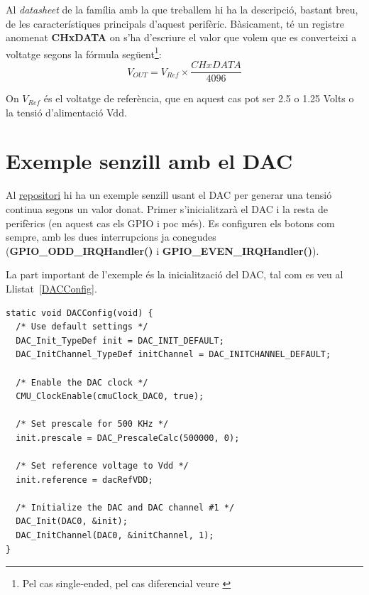 Al {\em datasheet} de la família amb la que treballem \cite[421]{EFM32GRM} hi ha la descripció, bastant breu, de les característiques principals d'aquest perifèric. Bàsicament, té un registre anomenat {\bf CHxDATA} on s'ha d'escriure el valor que volem que es converteixi a voltatge segons la fórmula següent\footnote{Pel cas single-ended, pel cas diferencial veure \cite[424]{EFM32GRM}}:
\begin{equation}
\label{eq:DACFormula}
 V_{OUT} = V_{Ref} \times \frac{CHxDATA}{4096}
\end{equation}

On $V_{Ref}$ és el voltatge de referència, que en aquest cas pot ser 2.5 o 1.25 Volts o la tensió d'alimentació Vdd.

\section{Exemple senzill amb el DAC}
\label{sec:DAC_Example_1}

Al \href{https://github.com/mariusmm/cursembedded/tree/master/Simplicity/DAC_1}{repositori} hi ha un exemple senzill usant el DAC per generar una tensió continua segons un valor donat.
Primer s'inicialitzarà el \gls{DAC} i la resta de perifèrics (en aquest cas els GPIO i poc més). Es configuren els botons com sempre, amb les dues interrupcions ja conegudes ({\bf GPIO\_ODD\_IRQHandler()} i {\bf GPIO\_EVEN\_IRQHandler()}).

La part important de l'exemple és la inicialització del DAC, tal com es veu al Llistat~\ref{DACConfig}.

\begin{lstlisting}[style=customc, caption=Inicialització del DAC, label=DACConfig]
static void DACConfig(void) {
  /* Use default settings */
  DAC_Init_TypeDef init = DAC_INIT_DEFAULT;
  DAC_InitChannel_TypeDef initChannel = DAC_INITCHANNEL_DEFAULT;

  /* Enable the DAC clock */
  CMU_ClockEnable(cmuClock_DAC0, true);

  /* Set prescale for 500 KHz */
  init.prescale = DAC_PrescaleCalc(500000, 0);

  /* Set reference voltage to Vdd */
  init.reference = dacRefVDD;

  /* Initialize the DAC and DAC channel #1 */
  DAC_Init(DAC0, &init);
  DAC_InitChannel(DAC0, &initChannel, 1);
}
\end{lstlisting}

